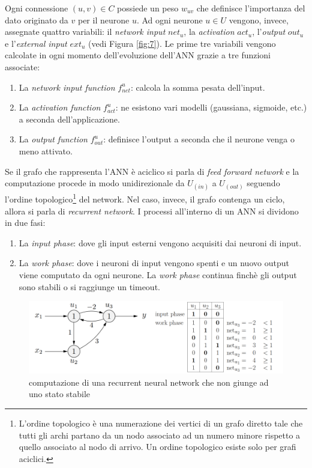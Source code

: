 \documentclass[10pt,a4paper]{article}
\begin{document}
Ogni connessione $(u,v) \in C$ possiede un peso $w_{uv}$ che definisce l'importanza del dato originato da $v$ per il neurone $u$. Ad ogni neurone $u \in U$ vengono, invece, assegnate quattro variabili: il \emph{network input} $net_u$, la \emph{activation} $act_u$, l'\emph{output} $out_u$ e l'\emph{external input} $ext_u$ (vedi Figura \ref{fig:7}). Le prime tre variabili vengono calcolate in ogni momento dell'evoluzione dell'ANN grazie a tre funzioni associate:

\begin{enumerate}
\item{La \emph{network input function} $f^u_{net}$: calcola la somma pesata dell'input.}
\item{La \emph{activation function} $f^u_{act}$: ne esistono vari modelli (gaussiana, sigmoide, etc.) a seconda dell'applicazione.}
\item{La \emph{output function} $f^u_{out}$: definisce l'output a seconda che il neurone venga o meno attivato.}
\end{enumerate}

Se il grafo che rappresenta l'ANN è aciclico si parla di \emph{feed forward network} e la computazione procede in modo unidirezionale da $U_{(in)}$ a $U_{(out)}$ seguendo l'ordine topologico\footnote{L'ordine topologico è una numerazione dei vertici di un grafo diretto tale che tutti gli archi partano da un nodo associato ad un numero minore rispetto a quello associato al nodo di arrivo. Un ordine topologico esiste solo per grafi aciclici.} del network. Nel caso, invece, il grafo contenga un ciclo, allora si parla di \emph{recurrent network}.
I processi all'interno di un ANN si dividono in due fasi:

\begin{enumerate}
\item{La \emph{input phase}: dove gli input esterni vengono acquisiti dai neuroni di input.}
\item{La \emph{work phase}: dove i neuroni di input vengono spenti e un nuovo output viene computato da ogni neurone. La \emph{work phase} continua finchè gli output sono stabili o si raggiunge un timeout.}
\end{enumerate}

\begin{figure}
\centering
\includegraphics[scale=0.3]{img/rnn1.png}
\caption{computazione di una recurrent neural network che non giunge ad uno stato stabile}
\label{fig:8}
\end{figure}
\end{document}

